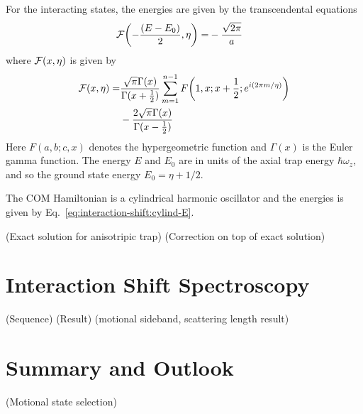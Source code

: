 For the interacting states,
the energies are given by the transcendental equations~\cite{idziaszek_analytical_2006}
\begin{align*}
  \mathcal{F}{\left({-\frac{{\left({E-E_0}\right)}}{2} , \eta}\right)}=&-\frac{\sqrt{2\pi}}{a}
\end{align*}
where $\mathcal{F}{\left({x, \eta}\right)}$ is given by
\begin{align*}
  \mathcal{F}{\left({x, \eta}\right)}=
  &\frac{\sqrt{\pi} \Gamma(x)}{\Gamma(x+\frac{1}{2})}  \sum_{m=1}^{n-1} F{\left({1,x;x+\frac{1}{2} ; e^{i(2\pi m/ \eta )}}\right)}\\
  &-\frac{2 \sqrt{\pi} \Gamma(x)}{\Gamma(x-\frac{1}{2})}
\end{align*}
Here $F(a,b;c,x)$ denotes the hypergeometric function
and $\Gamma(x)$ is the Euler gamma function.
The energy $E$ and $E_0$ are in units of the axial trap energy $\hbar \omega_z$,
and so the ground state energy $E_0  = \eta + 1/2$.

The COM Hamiltonian is a cylindrical harmonic oscillator and the energies is given by
Eq.~\ref{eq:interaction-shift:cylind-E}.

(Exact solution for anisotripic trap)
(Correction on top of exact solution)

\section{Interaction Shift Spectroscopy}
(Sequence)
(Result)
(motional sideband, scattering length result)

\section{Summary and Outlook}
(Motional state selection)
